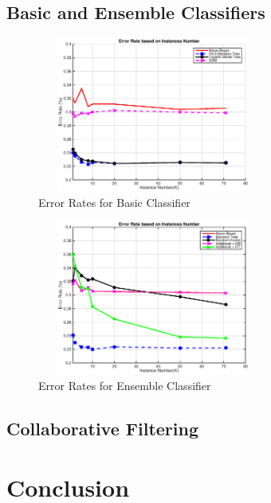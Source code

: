 \documentclass{sig-alternate-05-2015}
\begin{document}
\subsection{Basic and Ensemble Classifiers}

\begin{figure}
\centering
\includegraphics[height=2in, width=3in]{Basic_Classifiers}
\caption{Error Rates for Basic Classifier}
\label{fig:basic classifier}
\end{figure}

\begin{figure}
\centering
\includegraphics[height=2in, width=3in]{Ensemble_Classifiers}
\caption{Error Rates for Ensemble Classifier}
\label{fig:ensemble classifier}
\end{figure}

\subsection{Collaborative Filtering}

\section{Conclusion}

\medskip
\end{document}
